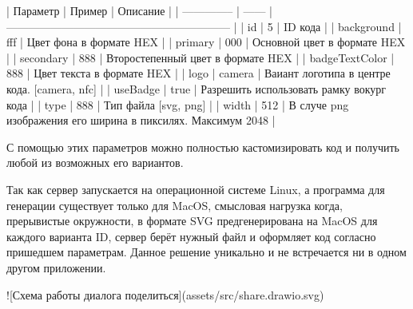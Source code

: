       | Параметр       | Пример | Описание                                                     |
      | -------------- | ------ | ------------------------------------------------------------ |
      | id             | 5      | ID кода                                                      |
      | background     | fff    | Цвет фона в формате HEX                                      |
      | primary        | 000    | Основной цвет в формате HEX                                  |
      | secondary      | 888    | Второстепенный цвет в формате HEX                            |
      | badgeTextColor | 888    | Цвет текста в формате HEX                                    |
      | logo           | camera | Ваиант логотипа в центре кода. [camera, nfc]                 |
      | useBadge       | true   | Разрешить использовать рамку вокург кода                     |
      | type           | 888    | Тип файла [svg, png]                                         |
      | width          | 512    | В случе png изображения его ширина в пиксилях. Максимум 2048 |

      С помощью этих параметров можно полностью кастомизировать код и получить любой из возможных его вариантов.

      Так как сервер запускается на операционной системе Linux, а программа для генерации существует только для MacOS, смысловая нагрузка когда, прерывистые окружности, в формате SVG предгенерирована на MacOS для каждого варианта ID, сервер берёт нужный файл и оформляет код согласно пришедшем параметрам. Данное решение уникально и не встречается ни в одном другом приложении.

      ![Схема работы диалога поделиться](assets/src/share.drawio.svg)

